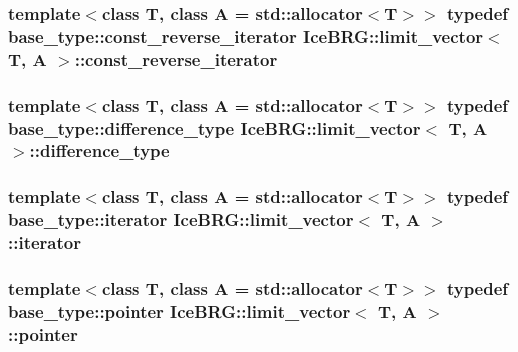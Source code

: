 \subsubsection[{const\+\_\+reverse\+\_\+iterator}]{\setlength{\rightskip}{0pt plus 5cm}template$<$class T, class A = std\+::allocator$<$\+T$>$$>$ typedef base\+\_\+type\+::const\+\_\+reverse\+\_\+iterator {\bf Ice\+B\+R\+G\+::limit\+\_\+vector}$<$ T, A $>$\+::{\bf const\+\_\+reverse\+\_\+iterator}}\label{classIceBRG_1_1limit__vector_a4feb81d3ff27e274df451f2fe85cd21a}
\hypertarget{classIceBRG_1_1limit__vector_ab5e21e09f06ae1a5327e9d47f31ef6b4}{}
\subsubsection[{difference\+\_\+type}]{\setlength{\rightskip}{0pt plus 5cm}template$<$class T, class A = std\+::allocator$<$\+T$>$$>$ typedef base\+\_\+type\+::difference\+\_\+type {\bf Ice\+B\+R\+G\+::limit\+\_\+vector}$<$ T, A $>$\+::{\bf difference\+\_\+type}}\label{classIceBRG_1_1limit__vector_ab5e21e09f06ae1a5327e9d47f31ef6b4}
\hypertarget{classIceBRG_1_1limit__vector_aea9e186f4c5fb359da52895bafba6335}{}
\subsubsection[{iterator}]{\setlength{\rightskip}{0pt plus 5cm}template$<$class T, class A = std\+::allocator$<$\+T$>$$>$ typedef base\+\_\+type\+::iterator {\bf Ice\+B\+R\+G\+::limit\+\_\+vector}$<$ T, A $>$\+::{\bf iterator}}\label{classIceBRG_1_1limit__vector_aea9e186f4c5fb359da52895bafba6335}
\hypertarget{classIceBRG_1_1limit__vector_a87f3142bb69e755ba61e51ddfa7e6eae}{}
\subsubsection[{pointer}]{\setlength{\rightskip}{0pt plus 5cm}template$<$class T, class A = std\+::allocator$<$\+T$>$$>$ typedef base\+\_\+type\+::pointer {\bf Ice\+B\+R\+G\+::limit\+\_\+vector}$<$ T, A $>$\+::{\bf pointer}}\label{classIceBRG_1_1limit__vector_a87f3142bb69e755ba61e51ddfa7e6eae}
\hypertarget{classIceBRG_1_1limit__vector_af3acb98a381ba86ca927f099591d1512}{}
